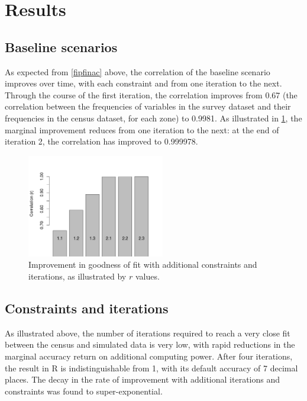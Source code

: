 \documentclass[a4paper,10pt]{article}
\begin{document}
\section{Results}
\label{cresults}

\subsection{Baseline scenarios}
As expected from \cref{fipfinac} above, the correlation of 
the baseline scenario improves over time, with each constraint 
and from one iteration to the next. Through the course of the first 
iteration, the correlation improves from 0.67 (the correlation between 
the frequencies of variables in the survey dataset and their frequencies 
in the census dataset, for each zone) to 0.9981. As illustrated in \cref{fnconscor}, 
the marginal improvement reduces from one iteration to the next: 
at the end of iteration 2, the correlation has improved to 0.999978.   

\begin{figure}
 \begin{center}
  \includegraphics[width=6cm]{corr-baseline}
 \end{center}
\caption{Improvement in goodness of fit with additional constraints and iterations, 
as illustrated by $r$ values.}
\label{fnconscor}
\end{figure}

\subsection{Constraints and iterations}
As illustrated above, the number of iterations 
required to reach a very close fit between the census
 and simulated data is very low, with rapid reductions in
 the marginal accuracy return on additional computing power.
 After four iterations, the result in R is indistinguishable from 1,
 with its default accuracy of 7 decimal places. 
The decay in the rate of improvement with additional 
iterations and constraints was found to super-exponential. 
\end{document}

